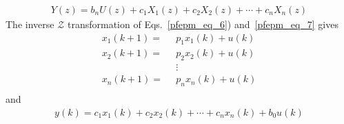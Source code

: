 \documentclass[12pt,a4paper,oneside]{book}
\begin{document}
\begin{onehalfspace}
\begin{equation}
	\begin{aligned}
		Y(z)= b_n U(z) + c_1X_1(z)+ c_2X_2(z)+ \cdots +c_nX_n(z)
	\end{aligned}
\end{equation}
The inverse $\mathcal{Z}$ transformation of Eqs.~\eqref{pfepm_eq_6}) 
and~\eqref{pfepm_eq_7} gives
\begin{equation}\label{pfepm_eq_8}
	\begin{aligned}
		x_1(k+1) =& \enspace p_1x_1(k)+u(k) \\[6pt]
		x_2(k+1) =& \enspace p_2x_2(k)+u(k) \\[6pt]
		& \enspace\vdots \\[6pt]
		x_n(k+1) =& \enspace p_nx_n(k)+u(k) \\[6pt]
	\end{aligned}
\end{equation}
and
\begin{equation}\label{pfepm_eq_9}
	\begin{aligned}
		y(k) = c_1x_1(k)+c_2x_2(k)+\cdots+c_nx_n(k)+b_0u(k)
	\end{aligned}
\end{equation}


\end{onehalfspace}
\end{document}
